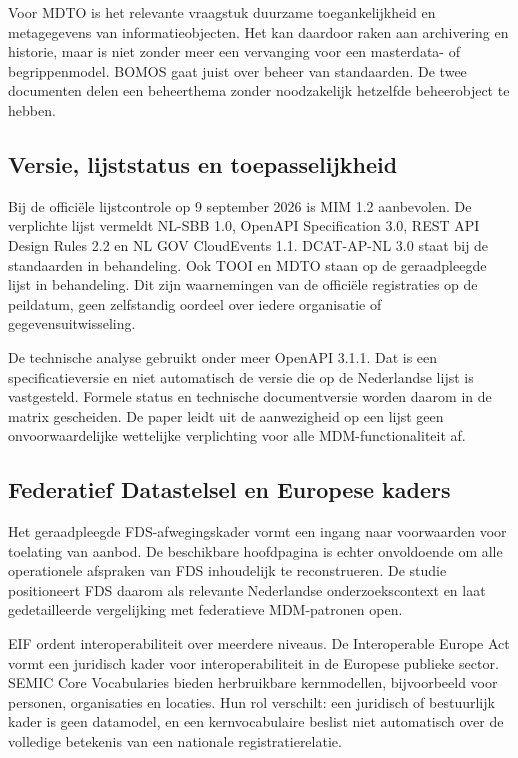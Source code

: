 Voor MDTO is het relevante vraagstuk duurzame toegankelijkheid en metagegevens van informatieobjecten. Het kan daardoor raken aan archivering en historie, maar is niet zonder meer een vervanging voor een masterdata- of begrippenmodel. BOMOS gaat juist over beheer van standaarden. De twee documenten delen een beheerthema zonder noodzakelijk hetzelfde beheerobject te hebben. \parencite{S24,S23}

\subsection{Versie, lijststatus en toepasselijkheid}
Bij de officiële lijstcontrole op 9 september 2026 is MIM 1.2 aanbevolen. De verplichte lijst vermeldt NL-SBB 1.0, OpenAPI Specification 3.0, REST API Design Rules 2.2 en NL GOV CloudEvents 1.1. DCAT-AP-NL 3.0 staat bij de standaarden in behandeling. Ook TOOI en MDTO staan op de geraadpleegde lijst in behandeling. Dit zijn waarnemingen van de officiële registraties op de peildatum, geen zelfstandig oordeel over iedere organisatie of gegevensuitwisseling. \parencite{F01,F02,F03}

De technische analyse gebruikt onder meer OpenAPI 3.1.1. Dat is een specificatieversie en niet automatisch de versie die op de Nederlandse lijst is vastgesteld. Formele status en technische documentversie worden daarom in de matrix gescheiden. De paper leidt uit de aanwezigheid op een lijst geen onvoorwaardelijke wettelijke verplichting voor alle MDM-functionaliteit af. \parencite{S19,F01,F03}

\subsection{Federatief Datastelsel en Europese kaders}
Het geraadpleegde FDS-afwegingskader vormt een ingang naar voorwaarden voor toelating van aanbod. De beschikbare hoofdpagina is echter onvoldoende om alle operationele afspraken van FDS inhoudelijk te reconstrueren. De studie positioneert FDS daarom als relevante Nederlandse onderzoekscontext en laat gedetailleerde vergelijking met federatieve MDM-patronen open. \parencite{S27}

EIF ordent interoperabiliteit over meerdere niveaus. De Interoperable Europe Act vormt een juridisch kader voor interoperabiliteit in de Europese publieke sector. SEMIC Core Vocabularies bieden herbruikbare kernmodellen, bijvoorbeeld voor personen, organisaties en locaties. Hun rol verschilt: een juridisch of bestuurlijk kader is geen datamodel, en een kernvocabulaire beslist niet automatisch over de volledige betekenis van een nationale registratierelatie. \parencite{S43,S42,S44}

